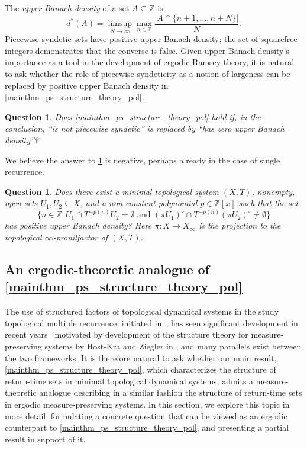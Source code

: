 \documentclass{article}
\theoremstyle{plain}
\newtheorem{question}[Theorem]{Question}
\theoremstyle{claim}
\theoremstyle{definition}
\theoremstyle{plain}
\theoremstyle{plain}
\newcommand{\Z}{\mathbb{Z}}
\newcommand{\1}{\boldsymbol{1}}
\begin{document}
The {\it upper Banach density} of a set $A \subseteq \Z$ is
\[d^*(A) = \limsup_{N \to \infty} \max_{n \in \Z} \frac{|A \cap \{n + 1, \ldots, n + N\}|}{N}.\]
Piecewise syndetic sets have positive upper Banach density; the set of squarefree integers demonstrates that the converse is false.  Given upper Banach density's importance as a tool in the development of ergodic Ramsey theory, it is natural to ask whether the role of piecewise syndeticity as a notion of largeness can be replaced by positive upper Banach density in \cref{mainthm_ps_structure_theory_pol}.


\begin{question}
\label{ques:non-ps-by-zero-density}
Does \cref{mainthm_ps_structure_theory_pol} hold if, in the conclusion, ``is not piecewise syndetic'' is replaced by ``has zero upper Banach density''?
\end{question}


We believe the answer to \cref{ques:non-ps-by-zero-density} is negative, perhaps already in the case of single recurrence.


\begin{question}\label{ques:sepecial_case}
Does there exist a minimal topological system $(X, T)$, nonempty, open sets $U_1, U_2 \subseteq X$, and a non-constant polynomial $p \in \Z[x]$ such that the set
\[
\big\{ n \in \Z : U_1 \cap T^{-p(n)} U_2 = \emptyset \text{ and } (\pi U_1)^\circ \cap T^{-p(n)} (\pi U_2)^\circ \neq \emptyset \big\} 
\]
has positive upper Banach density? Here $\pi: X \to X_{\infty}$ is the projection to the topological $\infty$-pronilfactor of $(X,T)$.
\end{question}



\subsection{An ergodic-theoretic analogue of \texorpdfstring{\cref{mainthm_ps_structure_theory_pol}}{Theorem A}}
\label{sec_ergodic_analogue}


The use of structured factors of topological dynamical systems in the study topological multiple recurrence, initiated in~\cite{MR1303514}, has seen significant development in recent years~\cite{glasner_huang_shao_weiss_ye_2020} motivated by development of the structure theory for measure-preserving systems by Host-Kra and Ziegler in \cite{Host_Kra05,Ziegler07}, and many parallels exist between the two frameworks. It is therefore natural to ask whether our main result, \cref{mainthm_ps_structure_theory_pol}, which characterizes the structure of return-time sets in minimal topological dynamical systems, admits a measure-theoretic analogue describing in a similar fashion the structure of return-time sets in ergodic measure-preserving systems.
In this section, we explore this topic in more detail, formulating a concrete question that can be viewed as an ergodic counterpart to \cref{mainthm_ps_structure_theory_pol}, and presenting a partial result in support of it.
\end{document}

